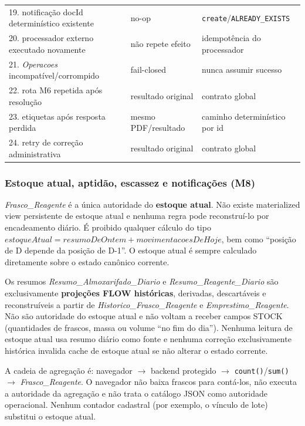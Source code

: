 \begin{longtable}{p{}p{}p{}}
19. notificação docId determinístico existente & no-op & \texttt{create}/\texttt{ALREADY\_EXISTS} \\
20. processador externo executado novamente & não repete efeito & idempotência do processador \\
21. \textit{Operacoes} incompatível/corrompido & fail-closed & nunca assumir sucesso \\
22. rota M6 repetida após resolução & resultado original & contrato global \\
23. etiquetas após resposta perdida & mesmo PDF/resultado & caminho determinístico por id \\
24. retry de correção administrativa & resultado original & contrato global \\
\end{longtable}

\subsubsection{Estoque atual, aptidão, escassez e notificações (M8)}
\label{sec:m8-estoque-escassez-notificacoes}

\begin{regra}
\textit{Frasco\_Reagente} é a única autoridade do \textbf{estoque atual}. Não existe materialized view persistente de estoque atual e nenhuma regra pode reconstruí-lo por encadeamento diário. É proibido qualquer cálculo do tipo $estoqueAtual = resumoDeOntem + movimentacoesDeHoje$, bem como ``posição de D depende da posição de D-1''. O estoque atual é sempre calculado diretamente sobre o estado canônico corrente.

Os resumos \textit{Resumo\_Almoxarifado\_Diario} e \textit{Resumo\_Reagente\_Diario} são exclusivamente \textbf{projeções FLOW históricas}, derivadas, descartáveis e reconstruíveis a partir de \textit{Historico\_Frasco\_Reagente} e \textit{Emprestimo\_Reagente}. Não são autoridade do estoque atual e não voltam a receber campos STOCK (quantidades de frascos, massa ou volume ``no fim do dia''). Nenhuma leitura de estoque atual usa resumo diário como fonte e nenhuma correção exclusivamente histórica invalida cache de estoque atual se não alterar o estado corrente.
\end{regra}

\begin{regra}
A cadeia de agregação é: navegador $\rightarrow$ backend protegido $\rightarrow$ \texttt{count()}/\texttt{sum()} $\rightarrow$ \textit{Frasco\_Reagente}. O navegador não baixa frascos para contá-los, não executa a autoridade da agregação e não trata o catálogo JSON como autoridade operacional. Nenhum contador cadastral (por exemplo, o vínculo de lote) substitui o estoque atual.
\end{regra}

